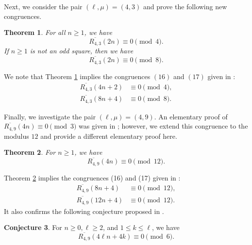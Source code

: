 \documentclass{amsart}
\newtheorem{theorem}{Theorem}[section]
\theoremstyle{definition}
\newtheorem{conjecture}[theorem]{Conjecture}
\begin{document}
Next, we consider the pair $(\ell,\mu)=(4,3)$
and prove the following new congruences.
\begin{theorem}\label{T432n} For all $n\geq1$, we have
\begin{equation}
\label{432n04}\overline{R_{4,3}}(2n)\equiv0\pmod{4}.
\end{equation}
If $n\geq1$ is not an odd square, then we have
\begin{equation}
\label{432n08}\overline{R_{4,3}}(2n)\equiv0\pmod{8}.
\end{equation}
\end{theorem}
We note that Theorem \ref{T432n} implies the congruences $(16)$ and $(17)$ given in \cite[Theorem 3.1]{Nadji-Ahmia-Ramirez}:
\begin{align*}
    \overline{R_{4,3}}(4n+2)&\equiv0\pmod{4},\\
    \overline{R_{4,3}}(8n+4)&\equiv0\pmod{8}.
\end{align*}

Finally, we investigate the pair $(\ell,\mu)=(4,9)$. An elementary proof of $\overline{R_{4,9}}(4n)\equiv 0\pmod{3}$ was given in \cite[Theorem 4.1]{Nadji-Ahmia-Ramirez}; however, we extend this congruence to %
the modulus $12$ and provide a different elementary proof here.
\begin{theorem}\label{T494n012} For $n\geq1$, we have
    \begin{equation}
       \label{494n012} \overline{R_{4,9}}(4n)\equiv 0\pmod{12}.
    \end{equation}
\end{theorem}

Theorem \ref{T494n012} implies the congruences (16) and (17) given in \cite[Theorem 4.1]{Alanazi-Munagi-Saikia}:
\begin{align*}
    \overline{R_{4,9}}(8n+4)&\equiv0\pmod{12},\\
     \overline{R_{4,9}}(12n+4)&\equiv0\pmod{12}.
\end{align*}
 It also confirms the following conjecture proposed in \cite{Alanazi-Munagi-Saikia}.
\begin{conjecture}\cite[Conjecture 5.1]{Alanazi-Munagi-Saikia}
    For $n\geq0,\ell\geq2$, and $1\leq k\leq\ell$, we have \begin{equation*}\label{conj}
        \overline{R_{4,9}}(4\ell n+4k)\equiv 0\pmod{6}.
    \end{equation*}
\end{conjecture}
\end{document}
